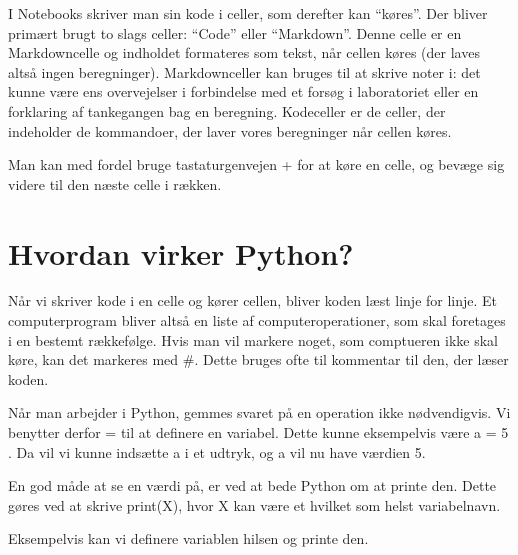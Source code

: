 \documentclass[letterpaper,10pt,english]{jupyterBook}
\begin{document}
I Notebooks skriver man sin kode i celler, som derefter kan “køres”. Der bliver primært brugt to slags celler: “Code” eller “Markdown”. Denne celle er en Markdown\sphinxhyphen{}celle og indholdet formateres som tekst, når cellen køres (der laves altså ingen beregninger). Markdown\sphinxhyphen{}celler kan bruges til at skrive noter i: det kunne være ens overvejelser i forbindelse med et forsøg i laboratoriet eller en forklaring af tankegangen bag en beregning.
Kodeceller er de celler, der indeholder de kommandoer, der laver vores beregninger når cellen køres.

 Man kan med fordel bruge tastaturgenvejen  +  for at køre en celle, og bevæge sig videre til den næste celle i rækken.


\section{Hvordan virker Python?}
\label{\detokenize{notebooks/Basal_python:hvordan-virker-python}}
Når  vi skriver kode i en celle og kører cellen, bliver koden læst linje for linje. Et computerprogram bliver altså en liste af computer\sphinxhyphen{}operationer, som skal foretages i en bestemt rækkefølge. Hvis man vil markere noget, som comptueren ikke skal køre, kan det markeres med \#. Dette bruges ofte til kommentar til den, der læser koden.

Når man arbejder i Python, gemmes svaret på en operation ikke nødvendigvis. Vi benytter derfor  =  til at definere en variabel. Dette kunne eksempelvis være  a = 5 . Da vil vi kunne indsætte a i et udtryk, og a vil nu have værdien 5.

En god måde at se en værdi på, er ved at bede Python om at printe den. Dette gøres ved at skrive print(X), hvor X kan være et hvilket som helst variabelnavn.

Eksempelvis kan vi definere variablen hilsen og printe den.

\begin{sphinxVerbatim}[commandchars=\\\{\}]
   
\end{sphinxVerbatim}
\end{document}
